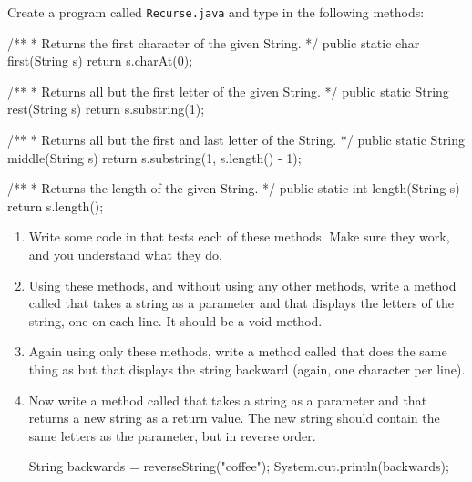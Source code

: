 \newpage
\begin{exercise}  %

Create a program called {\tt Recurse.java} and type in the following methods:

\begin{code}
/**
 * Returns the first character of the given String.
 */
public static char first(String s) {
    return s.charAt(0);
}
\end{code}

\begin{code}
/**
 * Returns all but the first letter of the given String.
 */
public static String rest(String s) {
    return s.substring(1);
}
\end{code}

\begin{code}
/**
 * Returns all but the first and last letter of the String.
 */
public static String middle(String s) {
    return s.substring(1, s.length() - 1);
}
\end{code}

\begin{code}
/**
 * Returns the length of the given String.
 */
public static int length(String s) {
    return s.length();
}
\end{code}

\begin{enumerate}

\item Write some code in  that tests each of these methods.
Make sure they work, and you understand what they do.

\item Using these methods, and without using any other  methods, write a method called  that takes a string as a parameter and that displays the letters of the string, one on each line.
It should be a void method.

\item Again using only these methods, write a method called  that does the same thing as  but that displays the string backward (again, one character per line).

\item Now write a method called  that takes a string as a parameter and that returns a new string as a return value.
The new string should contain the same letters as the parameter, but in reverse order.

\begin{code}
String backwards = reverseString("coffee");
System.out.println(backwards);
\end{code}


\end{enumerate}
\end{exercise}
